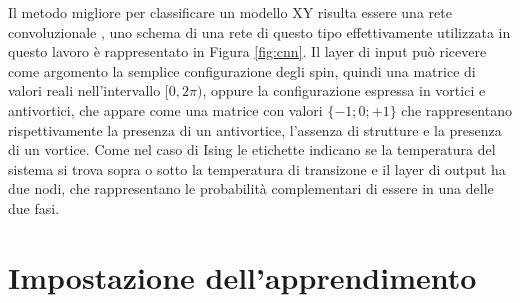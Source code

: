 \documentclass{article}
\begin{document}
Il metodo migliore per classificare un modello XY risulta essere una rete convoluzionale \cite{melko}, uno schema di una rete di questo tipo effettivamente utilizzata in questo lavoro è rappresentato in Figura \ref{fig:cnn}.
Il layer di input può ricevere come argomento la semplice configurazione degli spin, quindi una matrice di valori reali nell'intervallo $[0,2\pi)$, oppure la configurazione espressa in vortici e antivortici, che appare come una matrice con valori $\{-1;0;+1\}$ che rappresentano rispettivamente la presenza di un antivortice, l'assenza di strutture e la presenza di un vortice.
Come nel caso di Ising le etichette indicano se la temperatura del sistema si trova sopra o sotto la temperatura di transizone e il layer di output ha due nodi, che rappresentano le probabilità complementari di essere in una delle due fasi.



\section{Impostazione dell'apprendimento}
\end{document}
